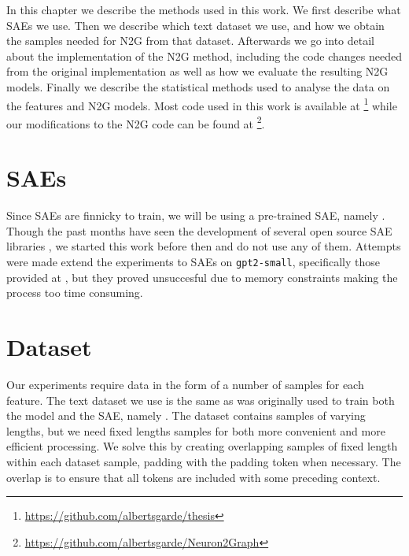 In this chapter we describe the methods used in this work.
We first describe what SAEs we use.
Then we describe which text dataset we use, and how we obtain the samples needed for N2G from that dataset.
Afterwards we go into detail about the implementation of the N2G method, including the code changes needed from the original implementation as well as how we evaluate the resulting N2G models.
Finally we describe the statistical methods used to analyse the data on the features and N2G models.
Most code used in this work is available at \footnote{\url{https://github.com/albertsgarde/thesis}} while our modifications to the N2G code can be found at \footnote{\url{https://github.com/albertsgarde/Neuron2Graph}}.

\section{SAEs}
Since SAEs are finnicky to train, we will be using a pre-trained SAE, namely \textcite{nanda_neelnandasparse_autoencoder_nodate}.
Though the past months have seen the development of several open source SAE libraries \parencite{bloom_jbloomaussaelens_2024}\parencite{cooney_ai-safety-foundationsparse_autoencoder_2024}, we started this work before then and do not use any of them.
Attempts were made extend the experiments to SAEs on \verb|gpt2-small|, specifically those provided at \textcite{wu_openaisparse_autoencoder_2024}, but they proved unsuccesful due to memory constraints making the process too time consuming.

\section{Dataset}
\label{sec:dataset}
Our experiments require data in the form of a number of samples for each feature.
The text dataset we use is the same as was originally used to train both the model and the SAE, namely \textcite{nanda_neelnandac4-code-20k_nodate}.
The dataset contains samples of varying lengths, but we need fixed lengths samples for both more convenient and more efficient processing.
We solve this by creating overlapping samples of fixed length within each dataset sample, padding with the padding token when necessary.
The overlap is to ensure that all tokens are included with some preceding context.

